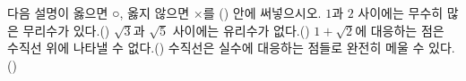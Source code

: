 다음 설명이 옳으면 ○, 옳지 않으면 ×를 (\quad) 안에 써넣으시오.
 $1$과 $2$ 사이에는 무수히 많은 무리수가 있다.\nobreak\hfill\mbox{(\qquad)}
 $\sqrt{3}$과 $\sqrt{5}$ 사이에는 유리수가 없다.\nobreak\hfill\mbox{(\qquad)}
 $1+\sqrt{2}$에 대응하는 점은 수직선 위에 나타낼 수 없다.\nobreak\hfill\mbox{(\qquad)}
 수직선은 실수에 대응하는 점들로 완전히 메울 수 있다.\nobreak\hfill\mbox{(\qquad)}

